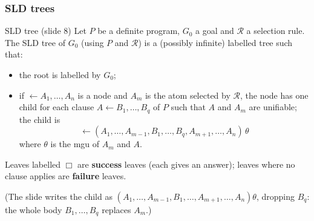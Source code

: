 \subsubsection{SLD trees}

\begin{nbdef}{SLD tree (slide 8)}
Let $P$ be a definite program, $G_0$ a goal and $\mathcal{R}$ a selection rule. The SLD tree
of $G_0$ (using $P$ and $\mathcal{R}$) is a (possibly infinite) labelled tree such that:
\begin{itemize}[nosep]
  \item the root is labelled by $G_0$;
  \item if $\leftarrow A_1, \ldots, A_n$ is a node and $A_m$ is the atom selected by
        $\mathcal{R}$, the node has one child for each clause $A \leftarrow B_1, \ldots, B_q$
        of $P$ such that $A$ and $A_m$ are unifiable; the child is
        \[ \leftarrow (A_1, \ldots, A_{m-1}, B_1, \ldots, B_q, A_{m+1}, \ldots, A_n)\,\theta \]
        where $\theta$ is the mgu of $A_m$ and $A$.
\end{itemize}
Leaves labelled $\Box$ are \textbf{success} leaves (each gives an answer); leaves where no
clause applies are \textbf{failure} leaves.
\end{nbdef}

(The slide writes the child as $(A_1, \ldots, A_{m-1}, B_1, \ldots, A_{m+1}, \ldots, A_n)\theta$,
dropping $B_q$: the whole body $B_1, \ldots, B_q$ replaces $A_m$.)

